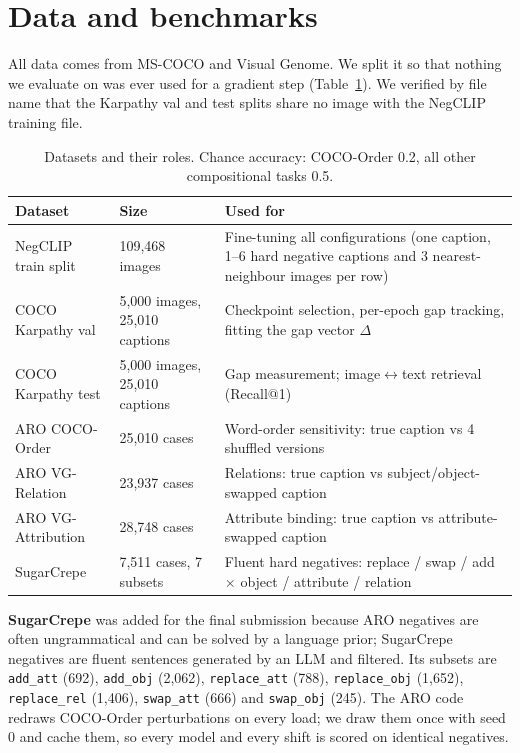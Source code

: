 \documentclass[11pt,a4paper]{article}
\newcommand{\gapv}{\Delta}
\begin{document}
\section{Data and benchmarks}

All data comes from MS-COCO \cite{coco} and Visual Genome. We split it so that nothing we evaluate on was
ever used for a gradient step (Table~\ref{tab:data}). We verified by file name that the Karpathy val and
test splits share no image with the NegCLIP training file.

\begin{table}[H]
\centering\small
\caption{Datasets and their roles. Chance accuracy: COCO-Order 0.2, all other compositional tasks 0.5.}
\label{tab:data}
\begin{tabular}{@{}llp{6.2cm}@{}}
\toprule
Dataset & Size & Used for\\
\midrule
NegCLIP train split & 109,468 images & Fine-tuning all configurations (one caption, 1--6 hard negative captions and 3 nearest-neighbour images per row)\\
COCO Karpathy val & 5,000 images, 25,010 captions & Checkpoint selection, per-epoch gap tracking, fitting the gap vector $\gapv$\\
COCO Karpathy test & 5,000 images, 25,010 captions & Gap measurement; image$\leftrightarrow$text retrieval (Recall@1)\\
ARO COCO-Order & 25,010 cases & Word-order sensitivity: true caption vs 4 shuffled versions\\
ARO VG-Relation & 23,937 cases & Relations: true caption vs subject/object-swapped caption\\
ARO VG-Attribution & 28,748 cases & Attribute binding: true caption vs attribute-swapped caption\\
SugarCrepe \cite{sugarcrepe} & 7,511 cases, 7 subsets & Fluent hard negatives: replace / swap / add $\times$ object / attribute / relation\\
\bottomrule
\end{tabular}
\end{table}

\textbf{SugarCrepe} was added for the final submission because ARO negatives are often ungrammatical
and can be solved by a language prior; SugarCrepe negatives are fluent sentences generated by an LLM
and filtered. Its subsets are \texttt{add\_att} (692), \texttt{add\_obj} (2,062),
\texttt{replace\_att} (788), \texttt{replace\_obj} (1,652), \texttt{replace\_rel} (1,406),
\texttt{swap\_att} (666) and \texttt{swap\_obj} (245). The ARO code redraws COCO-Order perturbations on
every load; we draw them once with seed 0 and cache them, so every model and every shift is scored on
identical negatives.
\end{document}
